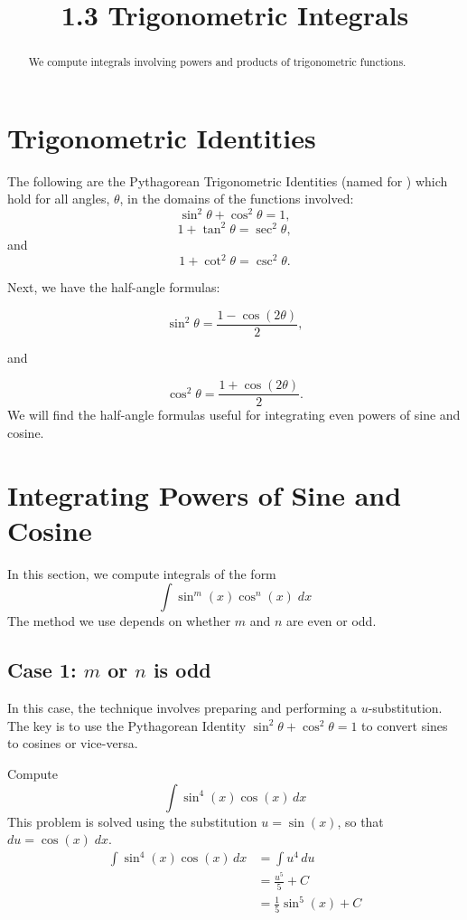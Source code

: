 \documentclass[handout]{ximera}
\title{1.3 Trigonometric Integrals}
\begin{document}
\begin{abstract}
We compute integrals involving powers and products of trigonometric functions.
\end{abstract}

\maketitle

\section{Trigonometric Identities}

The following are the Pythagorean Trigonometric Identities 
(named for ) which hold for all angles,
$\theta$, in the domains of the functions involved:
\[
\sin^2\theta + \cos^2\theta = 1,
\]
\[
1 + \tan^2\theta = \sec^2\theta,
\]
and
\[
1 + \cot^2\theta = \csc^2\theta.
\]


Next, we have the half-angle formulas:

\[
\sin^2\theta = \frac{1-\cos(2\theta)}{2},
\]

and

\[
\cos^2\theta = \frac{1+\cos(2\theta)}{2}.
\]
We will find the half-angle formulas useful for integrating even powers of sine and cosine.

\section{Integrating Powers of Sine and Cosine}

In this section, we compute integrals of the form
\[
\int \sin^m(x) \cos^n(x) \; dx
\]
The method we use depends on whether $m$ and $n$ are even or odd.

\subsection{Case 1: $m$ or $n$ is odd}
In this case, the technique involves preparing and performing a $u$-substitution. The key is to use the Pythagorean 
Identity $\sin^2 \theta + \cos^2 \theta = 1$ to convert
sines to cosines or vice-versa.

\begin{example}[example 1]
Compute
\[
\int \sin^4(x) \cos(x) \, dx
\]
This problem is solved using the substitution $u = \sin(x)$, so that $du = \cos(x) \; dx$.
\begin{align*}
\int \sin^4(x) \cos(x) \, dx &= \int u^4 \, du\\
                             &= \frac{u^5}{5} + C\\
                             &= \frac15 \sin^5(x) + C
\end{align*}

\end{example}
\end{document}
